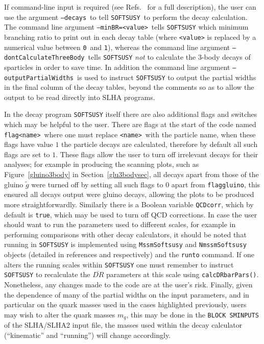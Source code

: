 \documentclass[final,3p,times]{elsarticle}
\def\SOFTSUSY{{\tt SOFTSUSY}}
\def\code#1{{\tt #1}}
\begin{document}
If command-line input is required (see
Refs.~\cite{Allanach:2001kg,Allanach:2013kza} 
for a full description), the user can use the argument 
\code{--decays}~to tell \SOFTSUSY~to perform the decay calculation. 
The command line argument \code{--minBR=<value>}~tells {\tt SOFTSUSY} which minimum
branching ratio to print out in each decay table (where \code{<value>} is
replaced by a numerical value between \code{0}~and \code{1}), whereas the
command line argument \code{--dontCalculateThreeBody}~tells {\tt SOFTSUSY} {\em
  not}\/ to calculate the 3-body decays of sparticles in order to save time. 
In addition the command line argument \code{--outputPartialWidths}~is used 
to instruct {\tt SOFTSUSY} to output the partial widths in the final column of
the decay tables, beyond the comments so as to allow the output to be read
directly into SLHA programs.

In the decay program {\tt SOFTSUSY} itself there are also additional flags and switches
which may be helpful to the user. There are flags at the start of the code named 
\code{flag<name>}~where one must replace \code{<name>}~with the particle name, when
these flags have value $1$ the particle decays are calculated, therefore by default
all such flags are set to $1$. These flags allow the user to turn off irrelevant
decays for their analyses; for example in producing the scanning plots, such as
Figure~\ref{gluino3body} in Section~\ref{glu3bodysec}, all decays apart from those of the
gluino $\tilde{g}$ were turned off by setting all such flags to $0$ apart from
{\tt flaggluino}, this ensured all decays output were gluino decays, allowing the
plots to be produced more straightforwardly. Similarly there is a Boolean variable
{\tt QCDcorr}, which by default is {\tt true}, which may be used to turn off QCD
corrections. In case the user should want to run the parameters used to different
scales, for example in performing comparisons with other decay calculators, it
should be noted that running in {\tt SOFTSUSY} is implemented using {\tt MssmSoftsusy}
and {\tt NmssmSoftsusy} objects (detailed in references \cite{Allanach:2001kg} and
\cite{Allanach:2013kza} respectively) and the {\tt runto} command. If one alters the
running scales within {\tt SOFTSUSY} one must remember to instruct {\tt SOFTSUSY}
to recalculate the $\overline{DR}$ parameters at this scale using {\tt calcDRbarPars()}.
Nonetheless, any changes made to the code are at the user's risk. Finally, given the
dependence of many of the partial widths on the input parameters, and in particular
on the quark masses used in the cases highlighted previously, users may wish to 
alter the quark masses $m_q$, this may be done in the {\tt BLOCK SMINPUTS} of the
SLHA/SLHA2 input file, the masses used within the decay calculator (``kinematic''
and ``running'') will change accordingly.
\end{document}
